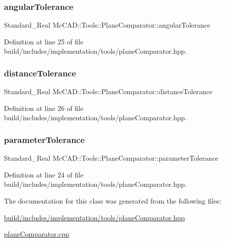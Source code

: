\subsubsection{\texorpdfstring{angular\+Tolerance}{angularTolerance}}
{\footnotesize\ttfamily Standard\+\_\+\+Real Mc\+C\+A\+D\+::\+Tools\+::\+Plane\+Comparator\+::angular\+Tolerance\hspace{0.3cm}{\ttfamily [private]}}



Definition at line 25 of file build/includes/implementation/tools/plane\+Comparator.\+hpp.

\mbox{\label{classMcCAD_1_1Tools_1_1PlaneComparator_a6e41cff0b95b5a5aa18de33ee9925e04}} 
\subsubsection{\texorpdfstring{distance\+Tolerance}{distanceTolerance}}
{\footnotesize\ttfamily Standard\+\_\+\+Real Mc\+C\+A\+D\+::\+Tools\+::\+Plane\+Comparator\+::distance\+Tolerance\hspace{0.3cm}{\ttfamily [private]}}



Definition at line 26 of file build/includes/implementation/tools/plane\+Comparator.\+hpp.

\mbox{\label{classMcCAD_1_1Tools_1_1PlaneComparator_adef35ba390ab77e8e03eadec54a87d5d}} 
\subsubsection{\texorpdfstring{parameter\+Tolerance}{parameterTolerance}}
{\footnotesize\ttfamily Standard\+\_\+\+Real Mc\+C\+A\+D\+::\+Tools\+::\+Plane\+Comparator\+::parameter\+Tolerance\hspace{0.3cm}{\ttfamily [private]}}



Definition at line 24 of file build/includes/implementation/tools/plane\+Comparator.\+hpp.



The documentation for this class was generated from the following files\+:\begin{DoxyCompactItemize}
\item 
\hyperlink{build_2includes_2implementation_2tools_2planeComparator_8hpp}{build/includes/implementation/tools/plane\+Comparator.\+hpp}\item 
\hyperlink{planeComparator_8cpp}{plane\+Comparator.\+cpp}\end{DoxyCompactItemize}
